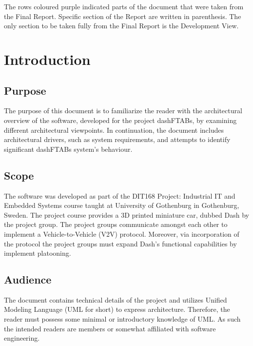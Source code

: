 \documentclass[12pt]{article}
\begin{document}
The rows coloured purple indicated parts of the document that were taken from the Final Report\cite{FinalReport}. Specific section of the Report are written in parenthesis. The only section to be taken fully from the Final Report is the Development View.
\pagebreak

\section{Introduction}
\subsection{Purpose}
The purpose of this document is to familiarize the reader with the architectural overview of the software, developed for the project dashFTABs, by examining different architectural viewpoints. In continuation, the document includes architectural drivers, such as system requirements, and attempts to identify significant dashFTABs system’s behaviour.\par

\subsection{Scope}
The software was developed as part of the DIT168 Project: Industrial IT and Embedded Systems course taught at University of Gothenburg in Gothenburg, Sweden. The project course provides a 3D printed miniature car, dubbed Dash by the project group. The project groups communicate amongst each other to implement a Vehicle-to-Vehicle (V2V) protocol. Moreover, via incorporation of the protocol the project groups must expand Dash’s functional capabilities by implement platooning.\par

\subsection{Audience}
The document contains technical details of the project and utilizes Unified Modeling Language (UML for short) to express architecture. Therefore, the reader must possess some minimal or introductory knowledge of UML. As such the intended readers are members or somewhat affiliated with software engineering.

\end{document}

